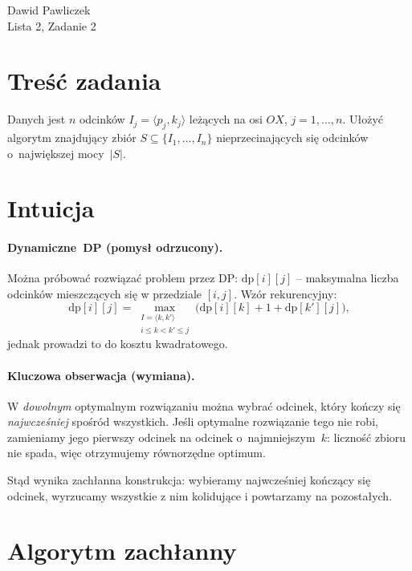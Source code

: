 \documentclass[11pt,a4paper]{article}
\begin{document}
\begin{center}
\Large Dawid Pawliczek\\
Lista 2, Zadanie 2
\end{center}

\bigskip
\section*{Treść zadania}

Danych jest $n$ odcinków
\(
  I_j=\langle p_j,k_j\rangle
\)
leżących na osi $OX$, $j=1,\dots,n$.
Ułożyć algorytm znajdujący zbiór
\(S\subseteq\{I_1,\dots,I_n\}\)
nieprzecinających się odcinków
o~największej mocy~\(|S|\).

\section*{Intuicja}

\paragraph{Dynamiczne~DP (pomysł odrzucony).}
Można próbować rozwiązać problem
przez DP: \(\text{dp}[i][j]\) –
maksymalna liczba odcinków mieszczących się
w przedziale \([i,j]\).
Wzór rekurencyjny:
\[
  \text{dp}[i][j]=
  \max_{\substack{I=\langle k,k'\rangle\\i\le k<k'\le j}}
  \bigl(
     \text{dp}[i][k]+1+\text{dp}[k'][j]
  \bigr),
\]
jednak prowadzi to do kosztu kwadratowego.

\paragraph{Kluczowa obserwacja (wymiana).}
W \emph{dowolnym} optymalnym rozwiązaniu
można wybrać odcinek, który kończy się
\emph{najwcześniej} spośród wszystkich.
Jeśli optymalne rozwiązanie tego nie robi,
zamieniamy jego pierwszy odcinek
na odcinek o~najmniejszym~$k$:
liczność zbioru nie spada,
więc otrzymujemy równorzędne optimum.

Stąd wynika zachłanna konstrukcja:
wybieramy najwcześniej kończący się odcinek,
wyrzucamy wszystkie z nim kolidujące
i powtarzamy na pozostałych.

\section*{Algorytm zachłanny}
\end{document}
